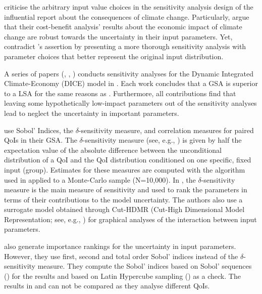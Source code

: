 \cite{Saltelli.2010} criticise the arbitrary input value choices in the sensitivity analysis design of the influential \cite{Stern.2007} report about the consequences of climate change. Particularly, \citeauthor{Stern.2007} argue that their cost-benefit analysis' results about the economic impact of climate change are robust towards the uncertainty in their input parameters. Yet, \cite{Saltelli.2010} contradict \citeauthor{Stern.2007}'s assertion by presenting a more thorough sensitivity analysis with parameter choices that better represent the original input distribution.

A series of papers (\cite{Anderson.2014}, \cite{Butler.2014}, \cite{Miftakhova.2018}) conducts sensitivity analyses for the Dynamic Integrated Climate-Economy (DICE) model in \cite{Nordhaus.2008}.  Each work concludes that a GSA is superior to a LSA for the same reasons as \cite{Harenberg.2019}. Furthermore, all contributions find that leaving some hypothetically low-impact parameters out of the sensitivity analyses lead \citeauthor{Nordhaus.2008} to neglect the uncertainty in important parameters.

\cite{Anderson.2014} use Sobol' Indices, the $\delta$-sensitivity measure, and correlation measures for paired QoIs in their GSA. The $\delta$-sensitivity measure (see, e.g., \cite{Borgonovo.2006}) is given by half the expectation value of the absolute difference between the unconditional distribution of a QoI and the QoI distribution conditioned on one specific, fixed input (group). Estimates for these measures are computed with the algorithm used in \cite{Plischke.2013} applied to a Monte-Carlo sample (N=10,000). In \cite{Anderson.2014}, the $\delta$-sensitivity measure is the main measure of sensitivity and used to rank the parameters in terms of their contributions to the model uncertainty. The authors also use a surrogate model obtained through Cut-HDMR (Cut-High Dimensional Model Representation; see, e.g., \cite{Ziehn.2009}) for graphical analyses of the interaction between input parameters.

\cite{Butler.2014} also generate importance rankings for the uncertainty in input parameters. However, they use first, second and total order Sobol' indices instead of the $\delta$-sensitivity measure. They compute the Sobol' indices based on Sobol' sequences (\cite{Sobol.1967}) for the results and based on Latin Hypercube sampling (\cite{McKay.1979}) as a check. The results in \cite{Butler.2014} and \cite{Anderson.2014} can not be compared as they analyse different QoIs.

